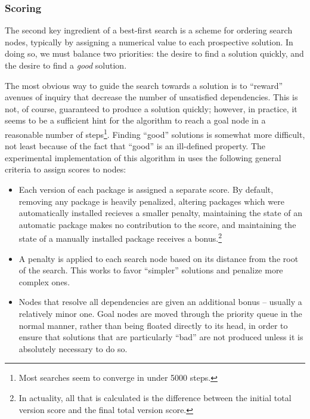 \documentclass[letterpaper]{article}
\theoremstyle{definition}
\theoremstyle{remark}
\newcommand{\pkg}[1]{\text{\url{#1}}}
\begin{document}
\subsubsection{Scoring}

The second key ingredient of a best-first search is a scheme for
ordering search nodes, typically by assigning a numerical value to
each prospective solution.  In doing so, we must balance two
priorities: the desire to find a solution quickly, and the desire to
find a \emph{good} solution.

The most obvious way to guide the search towards a solution is to
``reward'' avenues of inquiry that decrease the number of unsatisfied
dependencies.  This is not, of course, guaranteed to produce a
solution quickly; however, in practice, it seems to be a sufficient
hint for the algorithm to reach a goal node in a reasonable number of
steps\footnote{Most searches seem to converge in under 5000 steps.}.
Finding ``good'' solutions is somewhat more difficult, not least
because of the fact that ``good'' is an ill-defined property.  The
experimental implementation of this algorithm in \pkg{aptitude} uses
the following general criteria to assign scores to nodes:

\begin{itemize}
\item Each version of each package is assigned a separate score.  By
  default, removing any package is heavily penalized, altering
  packages which were automatically installed recieves a smaller
  penalty, maintaining the state of an automatic package makes no
  contribution to the score, and maintaining the state of a manually
  installed package receives a bonus.\footnote{In actuality, all that
    is calculated is the difference between the initial total version
    score and the final total version score.}

\item A penalty is applied to each search node based on its distance
  from the root of the search.  This works to favor ``simpler''
  solutions and penalize more complex ones.

\item Nodes that resolve all dependencies are given an additional
  bonus -- usually a relatively minor one.  Goal nodes are moved
  through the priority queue in the normal manner, rather than being
  floated directly to its head, in order to ensure that solutions that
  are particularly ``bad'' are not produced unless it is absolutely
  necessary to do so.
\end{itemize}
\end{document}
